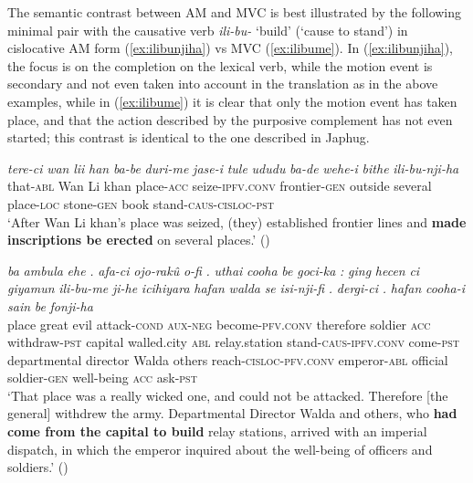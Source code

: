 \documentclass{article}
\newcommand{\ipa}[1]{\textit{{\phon\mbox{#1}}}} %
\begin{document}
 

The semantic contrast between AM and MVC is best illustrated by the following minimal pair with the causative verb \ipa{ili-bu-} `build' (`cause to stand') in cislocative AM form (\ref{ex:ilibunjiha}) vs MVC (\ref{ex:ilibume}). In (\ref{ex:ilibunjiha}), the focus is on the completion on the lexical verb, while the motion event is secondary and not even taken into account in the translation as in the above examples, while in (\ref{ex:ilibume}) it is clear that only the motion event has taken place, and that the action described by the purposive complement has not even started; this contrast is identical to the one described in Japhug.

\begin{exe}
\ex \label{ex:ilibunjiha}
\gll
\ipa{tere-ci} 	\ipa{wan} 	\ipa{lii} 	\ipa{han} 	\ipa{ba-be} 	\ipa{duri-me} 	\ipa{jase-i} 	\ipa{tule} 	\ipa{ududu} 	\ipa{ba-de} 	\ipa{wehe-i} 	\ipa{bithe} 	\ipa{ili-bu-nji-ha} \\
that-\textsc{abl} Wan Li khan place-\textsc{acc} seize-\textsc{ipfv.conv} frontier-\textsc{gen} outside several place-\textsc{loc} stone-\textsc{gen} book stand-\textsc{caus-cisloc-pst} \\
\glt ‘After Wan Li khan’s place was seized, (they) established frontier lines and \textbf{made inscriptions be erected} on several places.’ (\citealt[129-130;46]{shunjuu92yargiyan})
\end{exe}

\begin{exe}
\ex \label{ex:ilibume}
\gll
\ipa{ba} 	\ipa{ambula} 	\ipa{ehe} 	\ipa{.} 	\ipa{afa-ci} 	\ipa{ojo-rakû} 	\ipa{o-fi} 	\ipa{.} 	\ipa{uthai} 	\ipa{cooha} 	\ipa{be} 	\ipa{goci-ka} 	\ipa{:} 	\ipa{ging} 	\ipa{hecen} 	\ipa{ci} 	\ipa{giyamun} 	\ipa{ili-bu-me} 	\ipa{ji-he} 	\ipa{icihiyara} 	\ipa{hafan} 	\ipa{walda} 	\ipa{se} 	\ipa{isi-nji-fi} 	\ipa{.} 	\ipa{dergi-ci} 	\ipa{.} 	\ipa{hafan} 	\ipa{cooha-i} 	\ipa{sain} 	\ipa{be} 	\ipa{fonji-ha} \\
place great evil { } attack-\textsc{cond} \textsc{aux-neg} become-\textsc{pfv.conv} { } therefore soldier \textsc{acc} withdraw-\textsc{pst} { } capital walled.city \textsc{abl} relay.station stand-\textsc{caus-ipfv.conv} come-\textsc{pst} departmental director Walda others reach-\textsc{cisloc-pfv.conv} { } emperor-\textsc{abl} { } official soldier-\textsc{gen} well-being \textsc{acc} ask-\textsc{pst} \\
\glt `That place was a really wicked one, and could not be attacked. Therefore [the general] withdrew the army. Departmental Director Walda and others, who \textbf{had come from the capital to build} relay stations, arrived with an imperial dispatch, in which the emperor inquired about the well-being of officers and soldiers.' (\citealt[94/62]{cosmo06dzengseo})
\end{exe}
\end{document}
